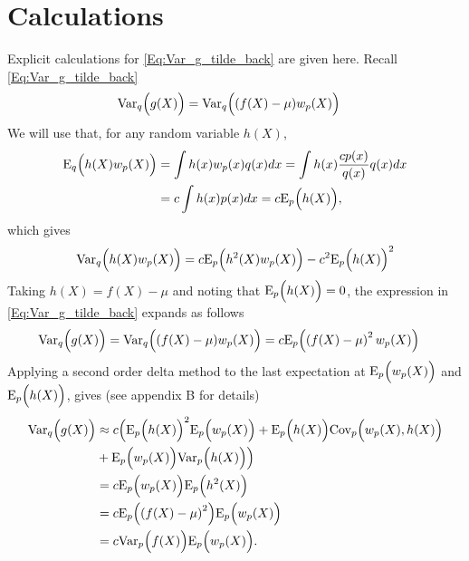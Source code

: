 \documentclass{amsart}
\newcommand{\Var}{\mathrm{Var}}
\theoremstyle{plain}%
\begin{document}




\appendix
\section{Calculations}  \label{Calculations}

Explicit calculations for \cref{Eq:Var_g_tilde_back} are given here.
Recall \cref{Eq:Var_g_tilde_back}
\begin{align*}
\Var_q \Bigl(g(X)\Bigr) & = \Var_q\Bigl( (f(X)-\mu) w_p(X) \Bigr)
\end{align*}
We will use that, for any random variable $h(X)$,
\begin{align*}
    \mathrm{E}_q\Bigl(h(X)w_p(X)\Bigr)
    &=\int h(x)w_p(x)q(x)dx
    =\int h(x)\frac{c p(x)}{q(x)} q(x)dx \\
    &=c\int h(x)p(x)dx
    =c\mathrm{E}_p\Bigl(h(X)\Bigr),
\end{align*}
which gives
\begin{align}
\begin{split}
\Var_q \Bigl(h(X)w_p(X) \Bigr)
= c \mathrm{E}_p \Bigl( h^2(X) w_p(X) \Bigr)
- c^2 \mathrm{E}_p\Bigl( h(X) \Bigr)^2
\end{split}
\label{eq:appendix:Eq_hw}
\end{align}
Taking $h(X) = f(X)-\mu$ and noting that $\mathrm{E}_p \Bigl(h(X)\Bigr)=0$, the expression in \cref{Eq:Var_g_tilde_back} expands as follows
\begin{align*}
  \Var_q\Bigl(g(X)\Bigr) & = \Var_q\Bigl( (f(X)-\mu) w_p(X) \Bigr) =
  c \mathrm{E}_p\Bigl( \left(f(X)-\mu\right)^2 w_p(X) \Bigr)
\end{align*}
Applying a second order delta method to the last expectation at $\mathrm{E}_p\Bigl(w_p(X)\Bigr)$ and $\mathrm{E}_p \Bigl(h(X) \Bigr)$, gives (see appendix B for details)
\begin{align}
\Var_q\Bigl(g(X)\Bigr) & \approx c \Bigl(\mathrm{E}_p\Bigl(h(X)\Bigr)^2 \mathrm{E}_p \Bigl(w_p(X)\Bigr) + \mathrm{E}_p\Bigl(h(X)\Bigr) \mathrm{Cov}_p \Bigl(w_p(X),h(X)\Bigr) \nonumber \\
& +  \mathrm{E}_p \Bigl(w_p(X)\Bigr) \Var_p\Bigl(h(X)\Bigr)\Bigr) \label{eq: matching_appendixB} \\
& = c \mathrm{E}_p \Bigl(w_p(X)\Bigr) \mathrm{E}_p \Bigl(h^2(X)\Bigr)  \\
& =
c \mathrm{E}_p\Bigl( \left(f(X)-\mu\right)^2 \Bigr)  
\mathrm{E}_p\Bigl( w_p(X) \Bigr)
\\ &= 
c \Var_p\Bigl( f(X) \Bigr) \mathrm{E}_p\Bigl( w_p(X) \Bigr).
\label{eq:appendix:varqwpx}
\end{align}
\end{document}
